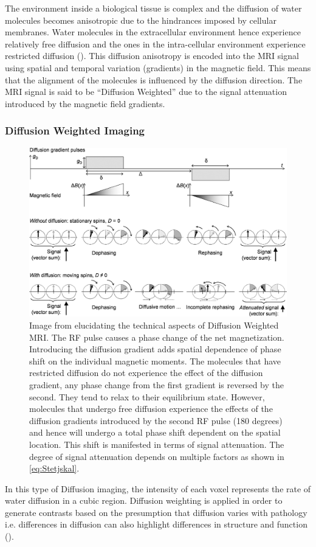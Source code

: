 \documentclass[msthesis.tex]{subfiles}
\begin{document}
The environment inside a biological tissue is complex and the diffusion of water molecules becomes anisotropic due to the hindrances imposed by cellular membranes. Water molecules in the extracellular environment hence experience relatively free diffusion and the ones in the intra-cellular environment experience restricted diffusion (\cite{toennies2017guide}). This diffusion anisotropy is encoded into the MRI signal using spatial and temporal variation (gradients) in the magnetic field. This means that the alignment of the molecules is influenced by the diffusion direction. The MRI signal is said to be “Diffusion Weighted” due to the signal attenuation introduced by the magnetic field gradients. 


\subsubsection{Diffusion Weighted Imaging}
\begin{figure}
    \centering
    \includegraphics[width=\textwidth]{images/diffusionmri.jpg}
    \caption{Image from \cite{technical_aspects_dmri} elucidating the technical aspects of Diffusion Weighted MRI. The RF pulse causes a phase change of the net magnetization. Introducing the diffusion gradient adds spatial dependence of phase shift on the individual magnetic moments. The molecules that have restricted diffusion do not experience the effect of the diffusion gradient, any phase change from the first gradient is reversed by the second. They tend to relax to their equilibrium state. However, molecules that undergo free diffusion experience the effects of the diffusion gradients introduced by the second RF pulse (180 degrees) and hence will undergo a total phase shift dependent on the spatial location. This shift is manifested in terms of signal attenuation. The degree of signal attenuation depends on multiple factors as shown in \autoref{eq:Stetjskal}.}
    \label{fig:diffmri}
\end{figure}
\label{sec:DWI}
In this type of Diffusion imaging, the intensity of each voxel represents the rate of water diffusion in a cubic region. Diffusion weighting is applied in order to generate contrasts based on the presumption that diffusion varies with pathology i.e. differences in diffusion can also highlight differences in structure and function (\cite{Taylor_1985}). 
\end{document}
